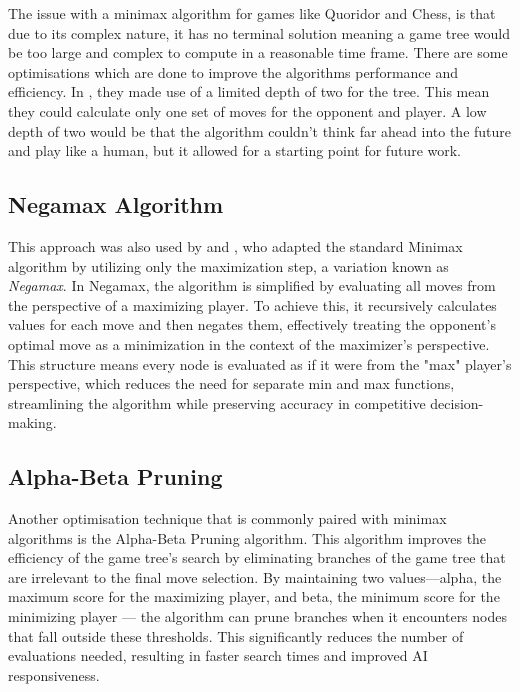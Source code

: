 \documentclass[review]{cmpreport}
\begin{document}
\noindent The issue with a minimax algorithm for games like Quoridor and Chess, is that due to its complex nature, it has no terminal solution meaning a game tree would be too large and complex to compute in a reasonable time frame. There are some optimisations which are done to improve the algorithms performance and efficiency. In \cite{josequoridor}, they made use of a limited depth of two for the tree. This mean they could calculate only one set of moves for the opponent and player. A low depth of two would be that the algorithm couldn't think far ahead into the future and play like a human, but it allowed for a starting point for future work. 

\subsection{Negamax Algorithm}
This approach was also used by \cite{glendenning2005mastering} and \cite{respall2018monte}, who adapted the standard Minimax algorithm by utilizing only the maximization step, a variation known as \textit{Negamax}. In Negamax, the algorithm is simplified by evaluating all moves from the perspective of a maximizing player. To achieve this, it recursively calculates values for each move and then negates them, effectively treating the opponent’s optimal move as a minimization in the context of the maximizer’s perspective. This structure means every node is evaluated as if it were from the "max" player's perspective, which reduces the need for separate min and max functions, streamlining the algorithm while preserving accuracy in competitive decision-making.

\subsection{Alpha-Beta Pruning}
Another optimisation technique that is commonly paired with minimax algorithms is the Alpha-Beta Pruning algorithm. This algorithm improves the efficiency of the game tree's search by eliminating branches of the game tree that are irrelevant to the final move selection. By maintaining two values—alpha, the maximum score for the maximizing player, and beta, the minimum score for the minimizing player — the algorithm can prune branches when it encounters nodes that fall outside these thresholds. This significantly reduces the number of evaluations needed, resulting in faster search times and improved AI responsiveness.
\end{document}
